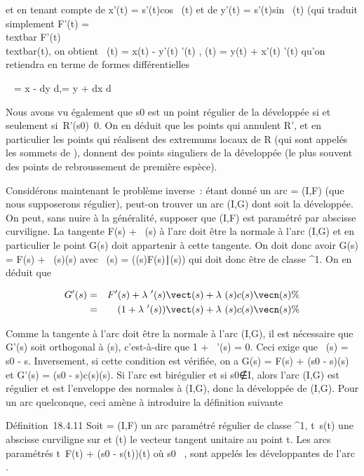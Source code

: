 et en tenant compte de x'(t) = s'(t)cos~ \phi(t)
et de y'(t) = s'(t)sin~ \phi(t) (qui traduit
simplement F'(t) =\\textbar{}
F'(t)\\textbar{}\vect(t), on obtient
\xi~(t) = x(t) - y'(t) \over \phi'(t) , \eta(t) = y(t) +
x'(t) \over \phi'(t) qu'on retiendra en terme de formes
différentielles

\xi~ = x - dy \over d\phi ,\quad \eta = y +
dx \over d\phi

Nous avons vu également que s0 est un point régulier de la
développée si et seulement
si~R'(s0)\neq~0. On en déduit que les
points qui annulent R', et en particulier les points qui réalisent des
extremums locaux de R (qui sont appelés les sommets de \Gamma), donnent des
points singuliers de la développée (le plus souvent des points de
rebroussement de première espèce).

Considérons maintenant le problème inverse~: étant donné un arc \Gamma =
(I,F) (que nous supposerons régulier), peut-on trouver un arc (I,G) dont
\Gamma soit la développée. On peut, sans nuire à la généralité, supposer que
(I,F) est paramétré par abscisse curviligne. La tangente F(s) +
~\vect(s) à l'arc \Gamma doit être la normale à l'arc
(I,G) et en particulier le point G(s) doit appartenir à cette tangente.
On doit donc avoir G(s) = F(s) + \lambda~(s)\vect(s) avec
\lambda~(s) =
(\overrightarrowG(s)F(s)∣\vect(s))
qui doit donc être de classe ^1. On en déduit que

\begin{align*} G'(s)& =& F'(s) +
\lambda~'(s)\vect(s) +
\lambda~(s)c(s)\vecn(s)\%& \\
& =& (1 + \lambda~'(s))\vect(s) +
\lambda~(s)c(s)\vecn(s) \%&
\\ \end{align*}

Comme la tangente à l'arc \Gamma doit être la normale à l'arc (I,G), il est
nécessaire que G'(s) soit orthogonal à \vect(s),
c'est-à-dire que 1 + \lambda~'(s) = 0. Ceci exige que \lambda~(s) = s0 - s.
Inversement, si cette condition est vérifiée, on a G(s) = F(s) +
(s0 - s)\vect(s) et G'(s) = (s0 -
s)c(s)\vecn(s). Si l'arc \Gamma est birégulier et si
s0∉I, alors l'arc (I,G) est
régulier et \Gamma est l'enveloppe des normales à (I,G), donc la développée
de (I,G). Pour un arc quelconque, ceci amène à introduire la définition
suivante

Définition~18.4.11 Soit \Gamma = (I,F) un arc paramétré régulier de classe
^1, t\mapsto~s(t) une abscisse
curviligne sur \Gamma et \vect(t) le vecteur tangent
unitaire au point t. Les arcs paramétrés
t\mapsto~F(t) + (s0 -
s(t))\vect(t) où s0 \in {}~, sont appelés les
développantes de l'arc \Gamma.

